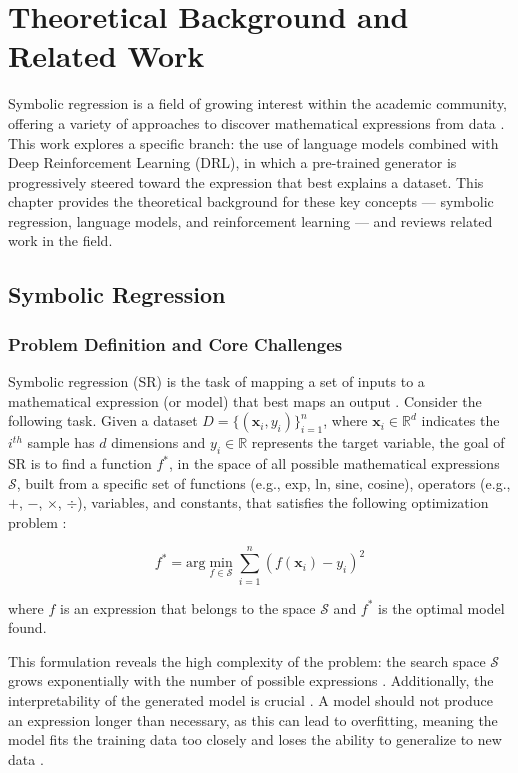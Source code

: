 \chapter{Theoretical Background and Related Work}
\label{ch:background}

Symbolic regression is a field of growing interest within the academic community, offering a variety of approaches to discover mathematical expressions from data \cite{dong2025RecentAdvances}. This work explores a specific branch: the use of language models combined with Deep Reinforcement Learning (DRL), in which a pre-trained generator is progressively steered toward the expression that best explains a dataset. This chapter provides the theoretical background for these key concepts --- symbolic regression, language models, and reinforcement learning --- and reviews related work in the field.

\section{Symbolic Regression}

\subsection{Problem Definition and Core Challenges}
Symbolic regression (SR) is the task of mapping a set of inputs to a mathematical expression (or model) that best maps an output \cite{lample2019deep, petersen2020deep}. Consider the following task. Given a dataset \(D = \{(\mathbf{x}_i, y_i)\}_{i=1}^{n}\), where \(\mathbf{x}_i \in \mathbb{R}^d\) indicates the \(i^{th}\) sample has \(d\) dimensions and \(y_i \in \mathbb{R}\) represents the target variable, the goal of SR is to find a function \(f^*\), in the space of all possible mathematical expressions \(\mathcal{S}\), built from a specific set of functions (e.g., exp, ln, sine, cosine), operators (e.g., $+$, $-$, \(\times\), \(\div\)), variables, and constants, that satisfies the following optimization problem \cite{lample2019deep}:

\begin{equation}
f^* = \mathrm{arg} \min_{f \in \mathcal{S}} \sum_{i=1}^n (f(\mathbf{x}_i) - y_i)^2
\end{equation}

where \(f\) is an expression that belongs to the space \(\mathcal{S}\) and \(f^*\) is the optimal model found.

This formulation reveals the high complexity of the problem: the search space \(\mathcal{S}\) grows exponentially with the number of possible expressions \cite{petersen2020deep}. Additionally, the interpretability of the generated model is crucial \cite{Rudin2019Stop}. A model should not produce an expression longer than necessary, as this can lead to overfitting, meaning the model fits the training data too closely and loses the ability to generalize to new data \cite{wilstrup2021symbolic}.

